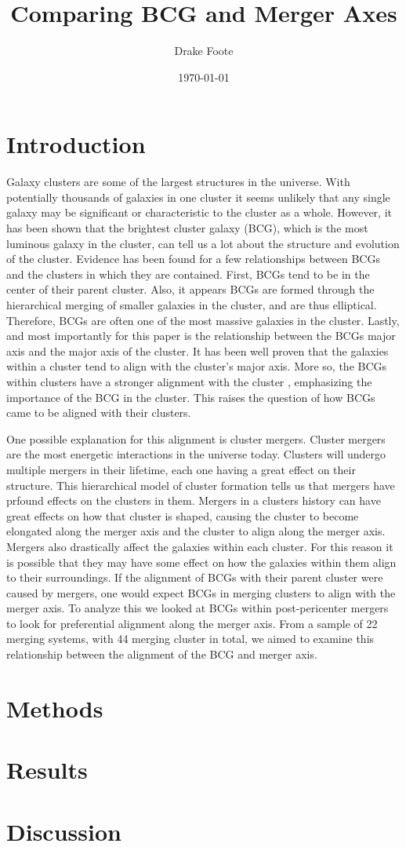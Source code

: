 \documentclass[a4paper,12pt]{article}
\begin{document}
\title{Comparing BCG and Merger Axes}
\author{Drake Foote}
\date{\today}
\maketitle
\section{Introduction}
	Galaxy clusters are some of the largest structures in the universe. With potentially thousands of galaxies in one cluster it seems unlikely that any single galaxy may be significant or characteristic to the cluster as a whole. However, it has been shown that the brightest cluster galaxy (BCG), which is the most luminous galaxy in the cluster, can tell us a lot about the structure and evolution of the cluster. Evidence has been found for a few relationships between BCGs and the clusters in which they are contained. First, BCGs tend to be in the center of their parent cluster. Also, it appears BCGs are formed through the hierarchical merging of smaller galaxies in the cluster, and are thus elliptical. Therefore, BCGs are often one of the most massive galaxies in the cluster. Lastly, and most importantly for this paper is the relationship between the BCGs major axis and the major axis of the cluster. It has been well proven that the galaxies within a cluster tend to align with the cluster's major axis. More so, the BCGs within clusters have a stronger alignment with the cluster \cite{West}, emphasizing the importance of the BCG in the cluster. This raises the question of how BCGs came to be aligned with their clusters. 
\par 
	One possible explanation for this alignment is cluster mergers. Cluster mergers are the most energetic interactions in the universe today. Clusters will undergo multiple mergers in their lifetime, each one having a great effect on their structure. This hierarchical model of cluster formation tells us that mergers have prfound effects on the clusters in them. Mergers in a clusters history can have great effects on how that cluster is shaped, causing the cluster to become elongated along the merger axis and the cluster to align along the merger axis. Mergers also drastically affect the galaxies within each cluster. For this reason it is possible that they may have some effect on how the galaxies within them align to their surroundings. If the alignment of BCGs with their parent cluster were caused by mergers, one would expect BCGs in merging clusters to align with the merger axis. To analyze this we looked at BCGs within post-pericenter mergers to look for preferential alignment along the merger axis. From a sample of 22 merging systems, with 44 merging cluster in total, we aimed to examine this relationship between the alignment of the BCG and merger axis. 	
\section{Methods}

\section{Results}
\section{Discussion}



\end{document}
